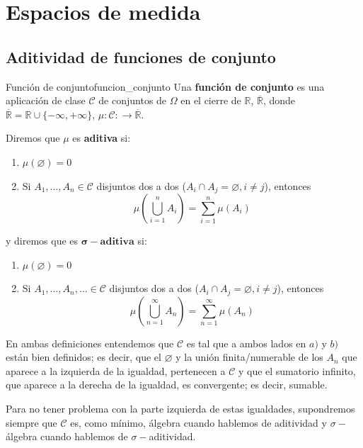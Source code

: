 \chapter{Espacios de medida}

\section{Aditividad de funciones de conjunto}

\begin{definicion}{Función de conjunto}{funcion_conjunto}
    Una \textbf{función de conjunto} es una aplicación de clase $\mathcal{C}$ de conjuntos de $\Omega$ en el cierre de $\mathbb{R}$, $\overline{\mathbb{R}}$, donde $\overline{\mathbb{R}}=\mathbb{R}\cup\{-\infty,+\infty\}$, $\mu:\mathcal{C}\colon\longrightarrow\overline{\mathbb{R}}$.

    Diremos que $\mu$ es \textbf{aditiva} si:
    \begin{enumerate}[label=\alph*)]
        \item $\mu(\varnothing)=0$
        \item Si $A_1,\hdots,A_n\in\mathcal{C}$ disjuntos dos a dos ($A_i\cap A_j=\varnothing, i\neq j$), entonces
        \[
        \mu\left(\bigcup_{i=1}^n A_i\right)=\sum_{i=1}^n \mu(A_i)
        \]
    \end{enumerate}
    y diremos que es $\mathbf{\sigma-aditiva}$ si:
    \begin{enumerate}[label=\alph*)]
        \item $\mu(\varnothing)=0$
        \item Si $A_1,\hdots,A_n,\hdots\in\mathcal{C}$ disjuntos dos a dos ($A_i\cap A_j=\varnothing, i\neq j$), entonces
        \[
        \mu\left(\bigcup_{n=1}^\infty A_n\right)=\sum_{n=1}^\infty \mu(A_n)
        \]
    \end{enumerate}
    En ambas definiciones entendemos que $\mathcal{C}$ es tal que a ambos lados en $a)$ y $b)$ están bien definidos; es decir, que el $\varnothing$ y la unión finita/numerable de los $A_n$ que aparece a la izquierda de la igualdad, pertenecen a $\mathcal{C}$ y que el sumatorio infinito, que aparece a la derecha de la igualdad, es convergente; es decir, sumable.

    Para no tener problema con la parte izquierda de estas igualdades, supondremos siempre que $\mathcal{C}$ es, como mínimo, álgebra cuando hablemos de aditividad y $\sigma-$álgebra cuando hablemos de $\sigma-$aditividad.
\end{definicion}
